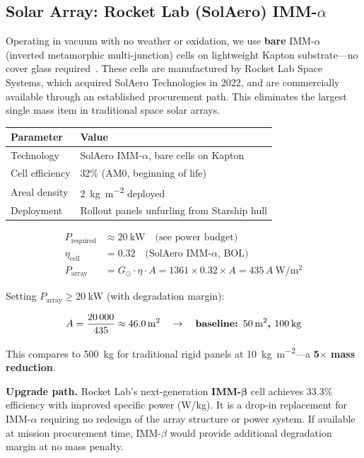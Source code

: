 \documentclass[12pt,letterpaper]{article}
\begin{document}
\subsection{Solar Array: Rocket Lab (SolAero) IMM-\texorpdfstring{$\alpha$}{alpha}}

Operating in vacuum with no weather or oxidation, we use \textbf{bare}
IMM-$\alpha$ (inverted metamorphic multi-junction) cells on lightweight Kapton
substrate---no cover glass required~\cite{SolAero}. These cells are
manufactured by Rocket Lab Space Systems, which acquired SolAero Technologies
in 2022, and are commercially available through an established procurement
path. This eliminates the largest single mass item in traditional space solar
arrays.

\begin{center}
\begin{tabular}{ll}
\toprule
\textbf{Parameter} & \textbf{Value} \\
\midrule
Technology & SolAero IMM-$\alpha$, bare cells on Kapton \\
Cell efficiency & 32\% (AM0, beginning of life) \\
Areal density & \SI{2}{\kilo\gram\per\meter\squared} deployed \\
Deployment & Rollout panels unfurling from Starship hull \\
\bottomrule
\end{tabular}
\end{center}

\begin{align}
  P_{\text{required}} &\approx \SI{20}{\kilo\watt} \quad \text{(see power budget)} \\
  \eta_{\text{cell}}  &= 0.32 \quad \text{(SolAero IMM-$\alpha$, BOL)} \\
  P_{\text{array}}    &= G_{\odot} \cdot \eta \cdot A
    = 1361 \times 0.32 \times A = 435\, A\ \si{\watt\per\meter\squared}
\end{align}

Setting $P_{\text{array}} \geq \SI{20}{\kilo\watt}$ (with degradation margin):

\[
  A = \frac{20\,000}{435} \approx \SI{46.0}{\meter\squared}
    \quad \rightarrow \quad \textbf{baseline: \SI{50}{\meter\squared},\ \SI{100}{\kilo\gram}}
\]

\noindent This compares to \SI{500}{\kilo\gram} for traditional rigid panels
at \SI{10}{\kilo\gram\per\meter\squared}---a \textbf{5$\times$ mass
reduction}.

\medskip
\noindent \textbf{Upgrade path.} Rocket Lab's next-generation
\textbf{IMM-$\boldsymbol\beta$} cell achieves 33.3\% efficiency with improved
specific power (W/kg). It is a drop-in replacement for IMM-$\alpha$ requiring
no redesign of the array structure or power system. If available at mission
procurement time, IMM-$\beta$ would provide additional degradation margin at no
mass penalty.
\end{document}
